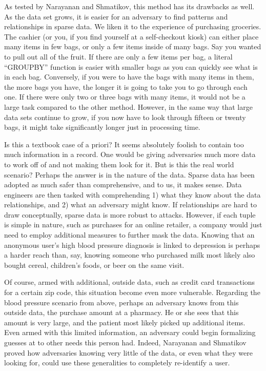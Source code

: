 \documentclass[10pt,journal,compsoc]{IEEEtran}
\begin{document}
	As tested by Narayanan and Shmatikov, this method has its drawbacks as well.  As the data set grows, it is easier for an adversary to find patterns and relationships in sparse data.  We liken it to the experience of purchasing groceries.  The cashier (or you, if you find yourself at a self-checkout kiosk) can either place many items in few bags, or only a few items inside of many bags.  Say you wanted to pull out all of the fruit.  If there are only a few items per bag, a literal “GROUPBY” function is easier with smaller bags as you can quickly see what is in each bag.  Conversely, if you were to have the bags with many items in them, the more bags you have, the longer it is going to take you to go through each one.  If there were only two or three bags with many items, it would not be a large task compared to the other method.  However, in the same way that large data sets continue to grow, if you now have to look through fifteen or twenty bags, it might take significantly longer just in processing time.
	
	Is this a textbook case of a priori?  It seems absolutely foolish to contain too much information in a record.  One would be giving adversaries much more data to work off of and not making them look for it. But is this the real world scenario? Perhaps the answer is in the nature of the data.  Sparse data has been adopted as much safer than comprehensive, and to us, it makes sense.  Data engineers are then tasked with comprehending 1) what they know about the data relationships, and 2) what an adversary might know.  If relationships are hard to draw conceptually, sparse data is more robust to attacks.  However, if each tuple is simple in nature, such as purchases for an online retailer, a company would just need to employ additional measures to further mask the data.  Knowing that an anonymous user’s high blood pressure diagnosis is linked to depression is perhaps a harder reach than, say, knowing someone who purchased milk most likely also bought cereal, children’s foods, or beer on the same visit.
	  
	Of course, armed with additional, outside data, such as credit card transactions for a certain zip code, this situation become even more vulnerable.  Regarding the blood pressure scenario from above, perhaps an adversary knows from this outside data, the purchase amount at a pharmacy.  He or she sees that this amount is very large, and the patient most likely picked up additional items.  Even armed with this limited information, an adversary could begin formalizing guesses at to other needs this person had.  Indeed, Narayanan and Shmatikov proved how adversaries knowing very little of the data, or even what they were looking for, could use these generalities to completely re-identify a user\cite{narayanan}.
	
\end{document}

